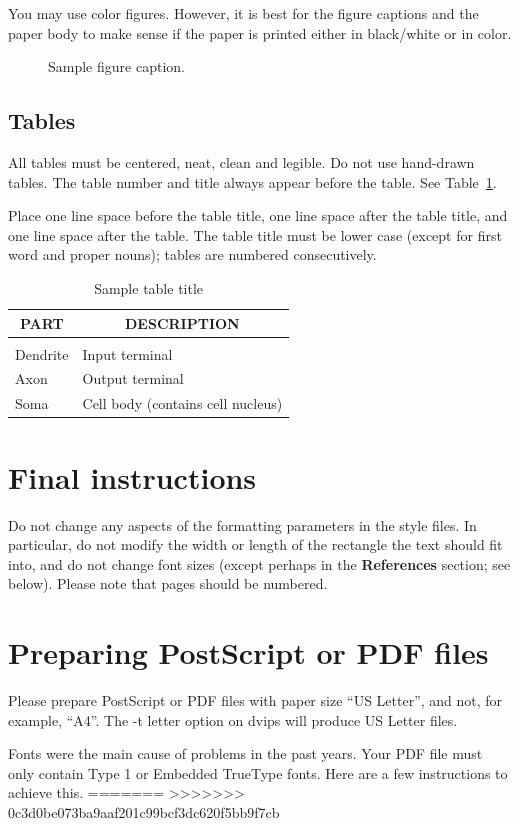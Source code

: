 \documentclass{article} %
\begin{document}
You may use color figures. 
However, it is best for the
figure captions and the paper body to make sense if the paper is printed
either in black/white or in color.
\begin{figure}[h]
\begin{center}
\fbox{\rule[-.5cm]{0cm}{4cm} \rule[-.5cm]{4cm}{0cm}}
\end{center}
\caption{Sample figure caption.}
\end{figure}

\subsection{Tables}

All tables must be centered, neat, clean and legible. Do not use hand-drawn
tables. The table number and title always appear before the table. See
Table~\ref{sample-table}.

Place one line space before the table title, one line space after the table
title, and one line space after the table. The table title must be lower case
(except for first word and proper nouns); tables are numbered consecutively.

\begin{table}[t]
\caption{Sample table title}
\label{sample-table}
\begin{center}
\begin{tabular}{ll}
\multicolumn{1}{c}{\bf PART}  &\multicolumn{1}{c}{\bf DESCRIPTION}
\\ \hline \\
Dendrite         &Input terminal \\
Axon             &Output terminal \\
Soma             &Cell body (contains cell nucleus) \\
\end{tabular}
\end{center}
\end{table}

\section{Final instructions}
Do not change any aspects of the formatting parameters in the style files.
In particular, do not modify the width or length of the rectangle the text
should fit into, and do not change font sizes (except perhaps in the
\textbf{References} section; see below). Please note that pages should be
numbered.

\section{Preparing PostScript or PDF files}

Please prepare PostScript or PDF files with paper size ``US Letter'', and
not, for example, ``A4''. The -t
letter option on dvips will produce US Letter files.

Fonts were the main cause of problems in the past years. Your PDF file must
only contain Type 1 or Embedded TrueType fonts. Here are a few instructions
to achieve this.
=======
>>>>>>> 0c3d0be073ba9aaf201c99bcf3dc620f5bb9f7cb



\end{document}
